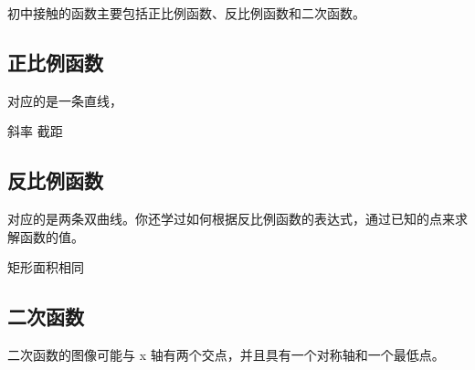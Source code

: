 
\begin{issues}
\issueDraft
\end{issues}

初中接触的函数主要包括正比例函数、反比例函数和二次函数。

\subsection{正比例函数}

对应的是一条直线，

斜率
截距

\subsection{反比例函数}

对应的是两条双曲线。你还学过如何根据反比例函数的表达式，通过已知的点来求解函数的值。

矩形面积相同

\subsection{二次函数}

二次函数的图像可能与  x  轴有两个交点，并且具有一个对称轴和一个最低点。